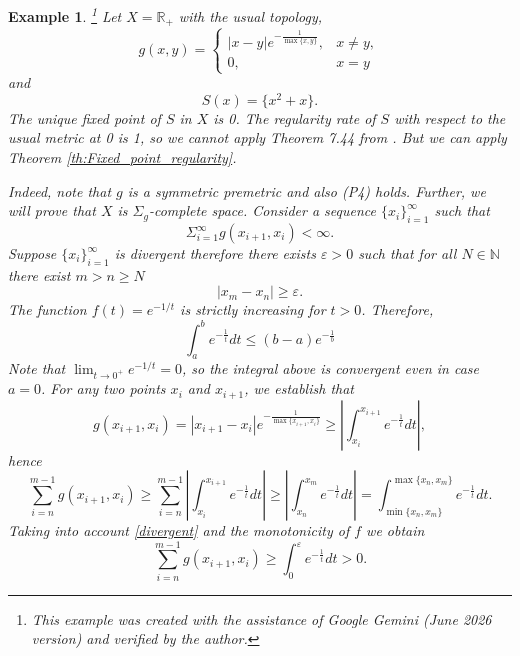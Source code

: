 \documentclass{article}
\newcommand{\N}{\mathbb{N}}
\newcommand{\R}{\mathbb{R}}
\newtheorem{examp}[theo]{Example}
\begin{document}
\begin{examp} \footnote{This example was created with the assistance of Google Gemini (June 2026 version) and verified by the author.} Let $X=\R_+$ with the usual topology, 
\[g(x,y)=\left\{\begin{array}{ll}|x-y|e^{-\frac{1}{\max\{x,y\}}}, & x \neq y,\\
0, & x=y\end{array}\right.\] and 
\[S(x)=\{x^2+x\}.\] The unique fixed point of $S$ in $X$ is 0. The regularity rate of $S$ with respect to the usual metric at 0 is 1, so we cannot apply Theorem 7.44 from \cite{Io}. But we can apply Theorem \ref{th:Fixed_point_regularity}.

Indeed, note that $g$ is a symmetric premetric and also (P4) holds. Further, we will prove that $X$ is $\Sigma_g$-complete space. Consider a sequence $\{x_i\}_{i=1}^{\infty}$ such that 
\begin{equation} \label{fin_s}
\displaystyle \Sigma_{i=1}^{\infty}g(x_{i+1},x_i)<\infty.\end{equation}
Suppose $\{x_i\}_{i=1}^{\infty}$ is divergent therefore there exists $\varepsilon>0$ such that for all $N \in \N$ there exist $m > n \geq N$
\begin{equation} \label{divergent}
|x_m-x_n| \geq \varepsilon.
\end{equation}
The function $f(t) = e^{-1/t}$ is strictly increasing for $t > 0$. Therefore,
$$\int_a^b e^{-\frac{1}{t}} dt \le (b - a) e^{-\frac{1}{b}}$$
Note that $\lim_{t \to 0^+} e^{-1/t} = 0$, so the integral above is convergent even in case $a=0$. For any two points $x_i$ and $x_{i+1}$, we establish that
$$g(x_{i+1}, x_i)=|x_{i+1}-x_i|e^{-\frac{1}{\max\{x_{i+1},x_i\}}} \ge \left| \int_{x_i}^{x_{i+1}} e^{-\frac{1}{t}} dt \right|,$$
hence
$$\sum_{i=n}^{m-1} g(x_{i+1}, x_i) \geq \sum_{i=n}^{m-1} \left| \int_{x_i}^{x_{i+1}} e^{-\frac{1}{t}} dt \right| \ge \left| \int_{x_n}^{x_m} e^{-\frac{1}{t}} dt \right| = \int_{\min\{x_n, x_m\}}^{\max\{x_n, x_m\}} e^{-\frac{1}{t}} dt.$$
Taking into account \ref{divergent} and the monotonicity of $f$ we obtain
$$\sum_{i=n}^{m-1} g(x_{i+1}, x_i) \ge \int_0^{\varepsilon} e^{-\frac{1}{t}} dt>0.$$

\end{examp}
\end{document}
